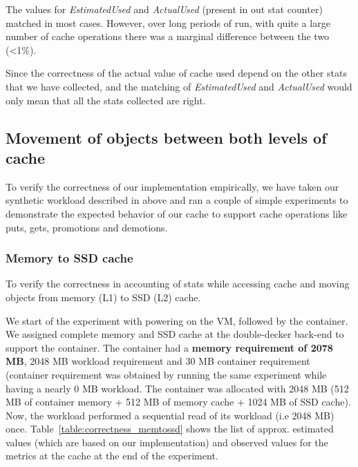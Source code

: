 	The values for \textit{EstimatedUsed} and \textit{ActualUsed} (present in out stat counter) matched in most cases.
	However, over long periods of run, with quite a large number of cache operations there was a marginal difference
	between the two (\textless 1\%).
	
	Since the correctness of the actual value of cache used depend on the other stats that we have collected, and the 
	matching of \textit{EstimatedUsed} and \textit{ActualUsed} would only mean that all the stats collected are right.
    
    \subsection{Movement of objects between both levels of cache}
	
	To verify the correctness of our implementation empirically, we have taken our synthetic workload described in 
	above and ran a couple of simple experiments to demonstrate the expected 
	behavior of our cache to support cache operations like puts, gets, promotions and demotions.  
	
	\subsubsection{Memory to SSD cache}

	    To verify the correctness in accounting of stats while accessing cache and moving objects from memory (L1) to SSD (L2) cache.
	    
	      We start of the experiment with powering on the VM, followed by the container. We assigned complete memory and SSD cache 
	    at the double-decker back-end to support the container. The container had a \textbf{memory requirement of 2078 MB}, 2048 MB workload
	    requirement and 30 MB container requirement (container requirement was obtained by running the same experiment while having
	    a nearly 0 MB workload. The container was allocated with 2048 MB (512 MB of container memory + 512 MB of memory cache 
	    + 1024 MB of SSD cache). Now, the workload performed a sequential read of its workload (i.e 2048 MB) once.
	    Table~\ref{table:correctness_memtossd} shows the list of approx. estimated values (which are based on our 
	    implementation) and observed values for the metrics at the cache at the end of the experiment. 
	    
